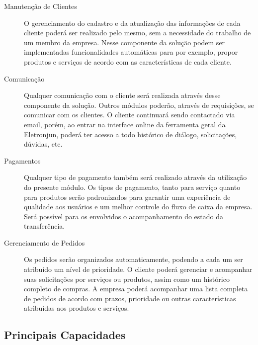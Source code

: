       \begin{description}
        \item[Manutenção de Clientes] O gerenciamento do cadastro e da atualização das informações de cada cliente poderá ser realizado pelo mesmo, sem a necessidade do trabalho de um membro da empresa. Nesse componente da solução podem ser implementadas funcionalidades automáticas para por exemplo, propor produtos e serviços de acordo com as características de cada cliente.
        \item[Comunicação] Qualquer comunicação com o cliente será realizada através desse componente da solução. Outros módulos poderão, através de requisições, se comunicar com os clientes. O cliente continuará sendo contactado via email, porém, ao entrar na interface online da ferramenta geral da Eletronjun, poderá ter acesso a todo histórico de diálogo, solicitações, dúvidas, etc.
        \item[Pagamentos] Qualquer tipo de pagamento também será realizado através da utilização do presente módulo. Os tipos de pagamento, tanto para serviço quanto para produtos serão padronizados para garantir uma experiência de qualidade aos usuários e um melhor controle do fluxo de caixa da empresa. Será possível para os envolvidos o acompanhamento do estado da transferência.
        \item[Gerenciamento de Pedidos] Os pedidos serão organizados automaticamente, podendo a cada um ser atribuído um nível de prioridade. O cliente poderá gerenciar e acompanhar suas solicitações por serviços ou produtos, assim como um histórico completo de compras. A empresa poderá acompanhar uma lista completa de pedidos de acordo com prazos, prioridade ou outras características atribuídas aos produtos e serviços.
      \end{description}

    \subsection{Principais Capacidades}

